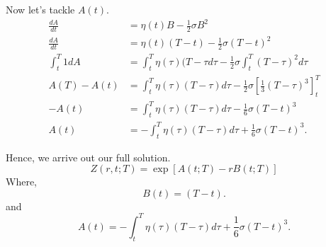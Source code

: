 \documentclass[11pt]{article}
\begin{document}
Now let's tackle $A(t)$.
\begin{align}
    \frac{dA}{dt} &= \eta(t) B - \frac{1}{2} \sigma B^2\\[10pt]
    \frac{dA}{dt} &= \eta(t) (T-t) - \frac{1}{2} \sigma (T-t)^2 \\[10pt]
    \int_{t}^{T} 1 dA &= \int_{t}^{T} \eta(\tau) (T- \tau d\tau - \frac{1}{2} \sigma \int_{t}^{T} (T-\tau)^2 d\tau \\[10pt]
    A(T) - A(t) &= \int_{t}^{T} \eta(\tau) (T-\tau) d\tau - \frac{1}{2} \sigma \left[ \frac{1}{3} (T- \tau)^3 \right]_{t}^{T} \\[10pt]
    -A(t) &= \int_{t}^{T} \eta(\tau) (T-\tau) d\tau - \frac{1}{6} \sigma (T-t)^3 \\[10pt]
    A(t) &= - \int_{t}^{T} \eta(\tau) (T-\tau) d\tau + \frac{1}{6} \sigma (T-t)^3.
\end{align}

Hence, we arrive out our full solution.
\begin{equation}
    Z(r,t;T) = \exp \left[ A(t;T) - r B(t;T) \right]
\end{equation}
Where,
\begin{equation}
    B(t) = (T-t).
\end{equation}
and
\begin{equation}
    A(t) = - \int_{t}^{T} \eta(\tau) (T-\tau) d\tau + \frac{1}{6} \sigma (T-t)^3.
\end{equation}
\end{document}
